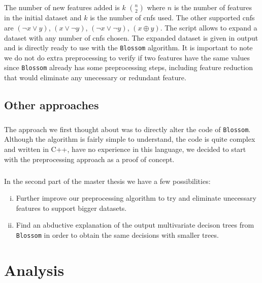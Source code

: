 \documentclass[12pt]{report}
\theoremstyle{definition}
\theoremstyle{definition}
\theoremstyle{definition}
\begin{document}
\paragraph{} The number of new features added is $k$ $n \choose 2$ where $n$ is the number of features in
the initial dataset and $k$ is the number of cnfs used. The other supported cnfs are $(\neg x \lor y)$,
$(x \lor \neg y)$, $(\neg x \lor \neg y)$, $(x \oplus y)$. The script allows to expand a dataset with any number
of cnfs chosen. The expanded dataset is given in output and is directly ready to use with the \texttt{Blossom} algorithm.
It is important to note we do not do extra preprocessing to verify if two features have the same values since
\texttt{Blossom} already has some preprocessing steps, including feature reduction that would eliminate any unecessary or
redundant feature.


\section{Other approaches}
\paragraph{} The approach we first thought about was to directly alter the code of \texttt{Blossom}. Although the
algorithm is fairly simple to understand, the code is quite complex and written in C++, have no experience in
this language, we decided to start with the preprocessing approach as a proof of concept.

\paragraph{} In the second part of the master thesis we have a few possibilities:

\begin{enumerate}[(i)]
    \item Further improve our preprocessing algorithm to try and eliminate unecessary features to support bigger
    datasets.
    \item Find an abductive explanation \cite{multivariate-explaining} of the output multivariate decison trees
    from \texttt{Blossom} in order to obtain the same decisions with smaller trees.
\end{enumerate}



\chapter{Analysis}
\end{document}
